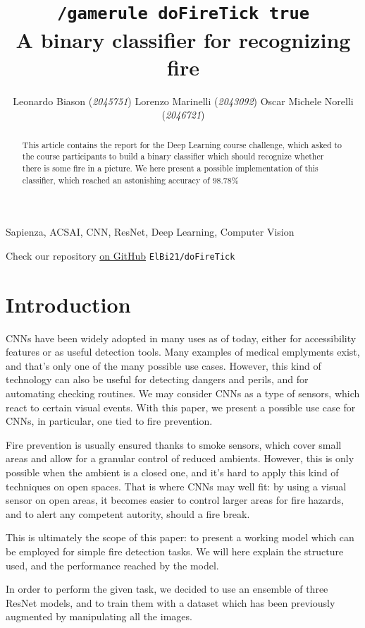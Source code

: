 \documentclass[11pt, journal]{IEEEtran}
\title{\texttt{/gamerule doFireTick true}\\A binary classifier for recognizing fire}
\author{Leonardo Biason (\textit{2045751}) \quad Lorenzo Marinelli (\textit{2043092}) \quad Oscar Michele Norelli (\textit{2046721})}
\newcommand{\nl}{

\medskip

}
\begin{document}
\maketitle

\begin{abstract}
    This article contains the report for the Deep Learning course challenge, which asked to the course participants to build a binary classifier which should recognize whether there is some fire in a picture. We here present a possible implementation of this classifier, which reached an astonishing accuracy of $\mathbf{98.78\%}$
\end{abstract}

\begin{keywords}
    Sapienza, ACSAI, CNN, ResNet, Deep Learning, Computer Vision 
\end{keywords}

\begin{tcolorbox}[colback = Purple!20, colframe = Purple!40]
    \begin{center}
         Check our repository \href{https://www.github.com/ElBi21/doFireTick}{on GitHub}
        \verb|ElBi21/doFireTick|
    \end{center}
\end{tcolorbox}

\section{Introduction}

CNNs have been widely adopted in many uses as of today, either for accessibility features or as useful detection tools. Many examples of medical emplyments exist, and that's only one of the many possible use cases. However, this kind of technology can also be useful for detecting dangers and perils, and for automating checking routines. We may consider CNNs as a type of sensors, which react to certain visual events. With this paper, we present a possible use case for CNNs, in particular, one tied to fire prevention.
\nl
\indent Fire prevention is usually ensured thanks to smoke sensors, which cover small areas and allow for a granular control of reduced ambients. However, this is only possible when the ambient is a closed one, and it's hard to apply this kind of techniques on open spaces. That is where CNNs may well fit: by using a visual sensor on open areas, it becomes easier to control larger areas for fire hazards, and to alert any competent autority, should a fire break.
\nl
\indent This is ultimately the scope of this paper: to present a working model which can be employed for simple fire detection tasks. We will here explain the structure used, and the performance reached by the model.
\nl
In order to perform the given task, we decided to use an ensemble of three ResNet \cite{7780459} models, and to train them with a dataset which has been previously augmented by manipulating all the images.
\end{document}
